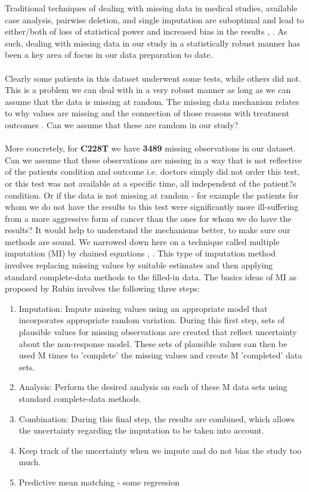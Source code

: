 \documentclass[a4paper]{article}
\begin{document}
Traditional techniques of dealing with missing data in medical studies, available case analysis, pairwise deletion, and single imputation are suboptimal and lead to either/both of loss of statistical power and increased bias in the results \cite{Bell2014}, \cite{Little2012}. As such, dealing with missing data in our study in a statistically robust manner has been a key area of focus in our data preparation to date.\\
\\
Clearly some patients in this dataset underwent some tests, while others did not. This is a problem we can deal with in a very robust manner as long as we can assume that the data is missing at random. The missing data mechanism relates to why values are missing and the connection of those reasons with treatment outcomes \cite{Garcia-Laencina2015}. Can we assume that these are random in our study? \\
\\
More concretely, for \textbf{C228T} we have \textbf{3489} missing observations in our dataset. Can we assume that these observations are missing in a way that is not reflective of the patients condition and outcome i.e. doctors simply did not order this test, or this test was not available at a specific time, all independent of the patient?s condition. Or if the data is not missing at random - for example the patients for whom we do not have the results to this test were significantly more ill-suffering from a more aggressive form of cancer than the ones for whom we do have the results? It would help to understand the mechanisms better, to make sure our methods are sound. We narrowed down here on a technique called multiple imputation (MI) by chained equations \cite{Graham2007}, \cite{Graham2009}. This type of imputation method involves replacing missing values by suitable estimates and then applying standard complete-data methods to the filled-in data. The basics ideas of MI as proposed by Rubin \cite{Rubin1996} involves the following three steps: 
\begin{enumerate}
\item Imputation: Impute missing values using an appropriate model that incorporates appropriate random variation. During this first step, sets of plausible values for missing observations are created that reflect uncertainty about the non-response model. These sets of plausible values can then be used M times to 'complete' the missing values and create M 'completed' data sets. 
\item Analysis: Perform the desired analysis on each of these M data sets using standard complete-data methods. 
\item Combination: During this final step, the results are combined, which allows the uncertainty regarding the imputation to be taken into account.
\item Keep track of the uncertainty when we impute and do not bias the study too much. 
\item Predictive mean matching - some regression 
\end{enumerate}
\end{document}
